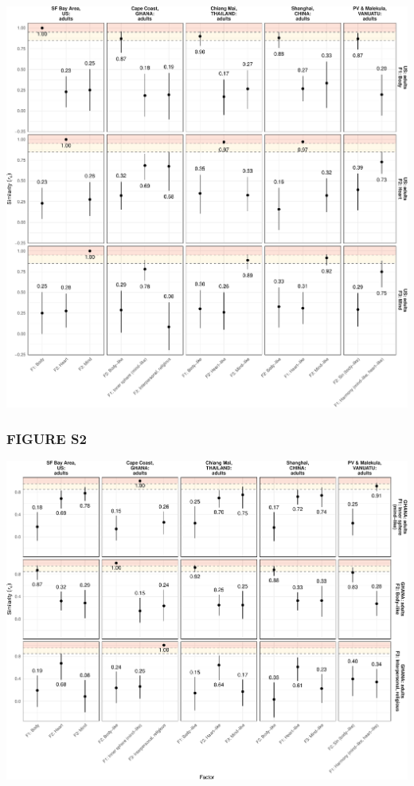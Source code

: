 \documentclass[
  man]{apa6}
\begin{document}
\includegraphics{Script_Re_Weisman_2021_Group1_2024_files/figure-latex/cong cis us base adults-1.pdf}

\hypertarget{figure-s2}{%
\subsubsection{FIGURE S2}\label{figure-s2}}

\includegraphics{Script_Re_Weisman_2021_Group1_2024_files/figure-latex/cong cis gh base adults-1.pdf}
\end{document}
